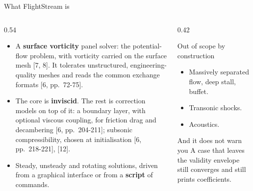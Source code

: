 \begin{frame}{What FlightStream is}
\begin{columns}[T]
\begin{column}{0.54\textwidth}
\begin{itemize}\small
  \item A \textbf{surface vorticity} panel solver: the potential-flow problem,
        with vorticity carried on the surface mesh [7, 8]. It tolerates
        unstructured, engineering-quality meshes and reads the common exchange
        formats [6, pp.~72-75].
  \item The core is \textbf{inviscid}. The rest is correction models on top of
        it: a boundary layer, with optional viscous coupling, for friction drag
        and decambering [6, pp.~204-211]; subsonic compressibility, chosen at
        initialisation [6, pp.~218-221], [12].
  \item Steady, unsteady and rotating solutions, driven from a graphical
        interface or from a \textbf{script} of commands.
\end{itemize}
\end{column}
\begin{column}{0.42\textwidth}
\begin{alertblock}{Out of scope by construction}
\begin{itemize}\small
  \item Massively separated flow, deep stall, buffet.
  \item Transonic shocks.
  \item Acoustics.
\end{itemize}
\end{alertblock}
\begin{alertblock}{And it does not warn you}
\small A case that leaves the validity envelope still converges and still
prints coefficients.
\end{alertblock}
\end{column}
\end{columns}
\end{frame}

